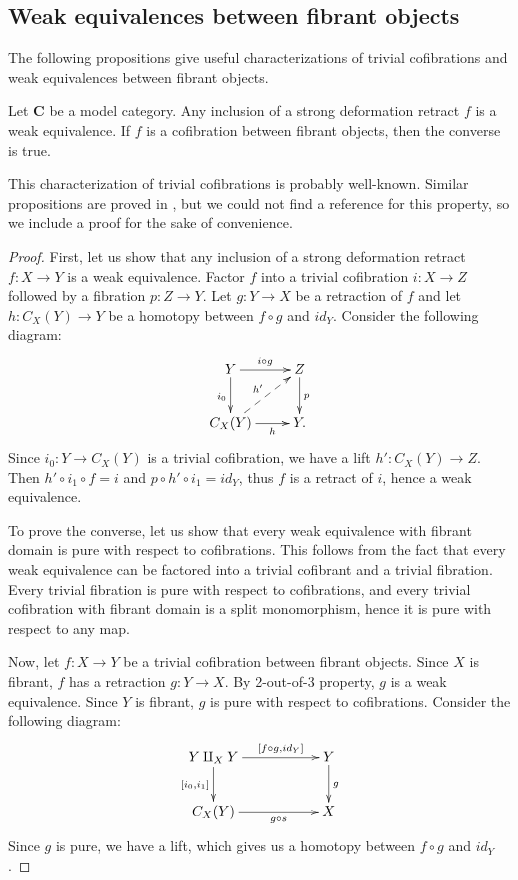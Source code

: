 \documentclass{tac}
\theoremstyle{definition}
\newcommand{\cat}[1]{\mathbf{#1}}
\newcommand{\C}{\cat{C}}
\newcommand{\cyli}{i}
\begin{document}
\subsection{Weak equivalences between fibrant objects}

The following propositions give useful characterizations of trivial
cofibrations and weak equivalences between fibrant objects.

\begin{prop}
Let $\C$ be a model category.
Any inclusion of a strong deformation retract $f$ is a weak equivalence.
If $f$ is a cofibration between fibrant objects, then the converse is true.
\end{prop}

This characterization of trivial cofibrations is probably well-known.
Similar propositions are proved in \cite{hirschhorn}, but we could not find a reference for this property, so we include a proof for the sake of convenience.

\begin{proof}
First, let us show that any inclusion of a strong deformation retract $f : X \to Y$ is a weak equivalence.
Factor $f$ into a trivial cofibration $i : X \to Z$ followed by a fibration $p : Z \to Y$.
Let $g : Y \to X$ be a retraction of $f$ and let $h : C_X(Y) \to Y$ be a homotopy between $f \circ g$ and $id_Y$.
Consider the following diagram:
\[ \xymatrix{ Y \ar[r]^{i \circ g} \ar[d]_{\cyli_0} & Z \ar[d]^p \\
              C_X(Y) \ar[r]_-h \ar@{-->}[ur]^{h'}   & Y.
            } \]
Since $\cyli_0 : Y \to C_X(Y)$ is a trivial cofibration, we have a lift $h' : C_X(Y) \to Z$.
Then $h' \circ \cyli_1 \circ f = i$ and $p \circ h' \circ \cyli_1 = id_Y$, thus $f$ is a retract of $i$, hence a weak equivalence.

To prove the converse, let us show that every weak equivalence with fibrant domain is pure with respect to cofibrations.
This follows from the fact that every weak equivalence can be factored into a trivial cofibrant and a trivial fibration.
Every trivial fibration is pure with respect to cofibrations, and every trivial cofibration with fibrant domain is a split monomorphism,
hence it is pure with respect to any map.

Now, let $f : X \to Y$ be a trivial cofibration between fibrant objects.
Since $X$ is fibrant, $f$ has a retraction $g : Y \to X$.
By 2-out-of-3 property, $g$ is a weak equivalence.
Since $Y$ is fibrant, $g$ is pure with respect to cofibrations.
Consider the following diagram:
\[ \xymatrix{ Y \amalg_X Y \ar[rr]^-{[f \circ g, id_Y]} \ar[d]_{[\cyli_0,\cyli_1]} & & Y \ar[d]^g \\
              C_X(Y) \ar[rr]_-{g \circ s} & & X
            } \]
Since $g$ is pure, we have a lift, which gives us a homotopy between $f \circ g$ and $id_Y$.
\end{proof}
\end{document}
